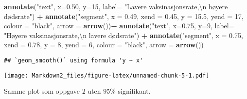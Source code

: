 \documentclass[
]{article}
\newenvironment{Shaded}{\begin{snugshade}}{\end{snugshade}}
\newcommand{\CharTok}[1]{\textcolor[rgb]{0.31,0.60,0.02}{#1}}
\newcommand{\DataTypeTok}[1]{\textcolor[rgb]{0.13,0.29,0.53}{#1}}
\newcommand{\DecValTok}[1]{\textcolor[rgb]{0.00,0.00,0.81}{#1}}
\newcommand{\FloatTok}[1]{\textcolor[rgb]{0.00,0.00,0.81}{#1}}
\newcommand{\KeywordTok}[1]{\textcolor[rgb]{0.13,0.29,0.53}{\textbf{#1}}}
\newcommand{\NormalTok}[1]{#1}
\newcommand{\OperatorTok}[1]{\textcolor[rgb]{0.81,0.36,0.00}{\textbf{#1}}}
\newcommand{\StringTok}[1]{\textcolor[rgb]{0.31,0.60,0.02}{#1}}
\begin{document}
\begin{Shaded}
\begin{Highlighting}[]
\StringTok{  }\KeywordTok{annotate}\NormalTok{(}\StringTok{"text"}\NormalTok{, }\DataTypeTok{x=}\FloatTok{0.50}\NormalTok{, }\DataTypeTok{y=}\DecValTok{15}\NormalTok{, }
           \DataTypeTok{label=} \StringTok{"Lavere vaksinasjonsrate,}\CharTok{\textbackslash{}n}\StringTok{ høyere dødsrate"}\NormalTok{) }\OperatorTok{+}
\StringTok{  }\KeywordTok{annotate}\NormalTok{(}\StringTok{"segment"}\NormalTok{, }\DataTypeTok{x =} \FloatTok{0.49}\NormalTok{, }
           \DataTypeTok{xend =} \FloatTok{0.45}\NormalTok{, }\DataTypeTok{y =} \FloatTok{15.5}\NormalTok{, }
           \DataTypeTok{yend =} \DecValTok{17}\NormalTok{, }\DataTypeTok{colour =} \StringTok{"black"}\NormalTok{, }\DataTypeTok{arrow =} \KeywordTok{arrow}\NormalTok{())}\OperatorTok{+}
\StringTok{  }\KeywordTok{annotate}\NormalTok{(}\StringTok{"text"}\NormalTok{, }\DataTypeTok{x=}\FloatTok{0.75}\NormalTok{, }\DataTypeTok{y=}\DecValTok{9}\NormalTok{, }
           \DataTypeTok{label=} \StringTok{"Høyere vaksinasjonsrate,}\CharTok{\textbackslash{}n}\StringTok{ lavere dødsrate"}\NormalTok{) }\OperatorTok{+}
\StringTok{  }\KeywordTok{annotate}\NormalTok{(}\StringTok{"segment"}\NormalTok{, }\DataTypeTok{x =} \FloatTok{0.75}\NormalTok{, }
           \DataTypeTok{xend =} \FloatTok{0.78}\NormalTok{, }\DataTypeTok{y =} \DecValTok{8}\NormalTok{, }
           \DataTypeTok{yend =} \DecValTok{6}\NormalTok{, }\DataTypeTok{colour =} \StringTok{"black"}\NormalTok{, }\DataTypeTok{arrow =} \KeywordTok{arrow}\NormalTok{())}
\end{Highlighting}
\end{Shaded}

\begin{verbatim}
## `geom_smooth()` using formula 'y ~ x'
\end{verbatim}

\texttt{[image: Markdown2\_files/figure-latex/unnamed-chunk-5-1.pdf]}

Samme plot som oppgave 2 uten 95\% signifikant.
\end{document}
